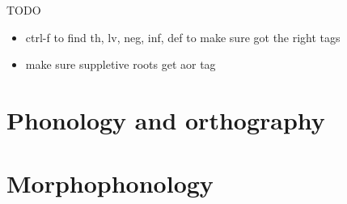 \documentclass[output=book,
  colorlinks,citecolor=brown,
draftmode,
		  ]{langscibook}
\begin{document}


\maketitle
\frontmatter

{\sloppy\tableofcontents}
  
  
  
\mainmatter


%

TODO

\begin{itemize}
	\item ctrl-f to find th, lv, neg, inf, def to make sure got the right tags
	\item make sure suppletive roots get aor tag
\end{itemize}




%
\part{Phonology and orthography}




%


\part{Morphophonology}
%
%
%
%

%



% 

\end{document}
